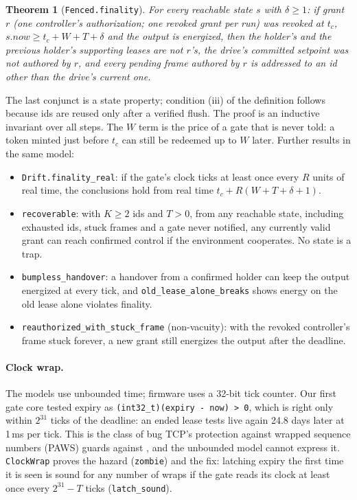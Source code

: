 \documentclass[letterpaper]{article} %
\newcommand{\code}[1]{\texttt{#1}}
\newtheorem{theorem}{Theorem}
\begin{document}
\begin{theorem}[\code{Fenced.finality}]
For every reachable state $s$ with $\delta \ge 1$: if grant $r$ (one controller's authorization;
one revoked grant per run) was revoked at $t_c$,
$s.\mathit{now} \ge t_c + W + T + \delta$ and the output is energized, then the holder's and
the previous holder's supporting leases are not $r$'s, the drive's committed setpoint was not
authored by $r$, and every pending frame authored by $r$ is addressed to an id other than the
drive's current one.
\end{theorem}

The last conjunct is a state property; condition (iii) of the definition follows because ids are
reused only after a verified flush. The proof is an inductive invariant over all steps. The $W$
term is the price of a gate that is
never told: a token minted just before $t_c$ can still be redeemed up to $W$ later. Further
results in the same model:

\begin{itemize}
\item \code{Drift.finality\_real}: if the gate's clock ticks at least once every $R$ units of real
time, the conclusions hold from real time $t_c + R(W + T + \delta + 1)$.
\item \code{recoverable}: with $K \ge 2$ ids and $T > 0$, from any reachable state, including
exhausted ids, stuck frames and a gate never notified, any currently valid grant can reach
confirmed control if the environment cooperates. No state is a trap.
\item \code{bumpless\_handover}: a handover from a confirmed holder can keep the output energized
at every tick, and \code{old\_lease\_alone\_breaks} shows energy on the old lease alone violates
finality.
\item \code{reauthorized\_with\_stuck\_frame} (non-vacuity): with the revoked controller's frame
stuck forever, a new grant still energizes the output after the deadline.
\end{itemize}

\paragraph{Clock wrap.} The models use unbounded time; firmware uses a 32-bit tick counter. Our
first gate core tested expiry as \code{(int32\_t)(expiry - now) > 0}, which is right only within
$2^{31}$ ticks of the deadline: an ended lease tests live again 24.8 days later at 1\,ms per tick.
This is the class of bug TCP's protection against wrapped sequence numbers (PAWS) guards
against \citep{rfc7323}, and the unbounded model cannot
express it. \code{ClockWrap} proves the hazard (\code{zombie}) and the fix: latching expiry the
first time it is seen is sound for any number of wraps if the gate reads its clock at least once
every $2^{31} - T$ ticks (\code{latch\_sound}).
\end{document}
